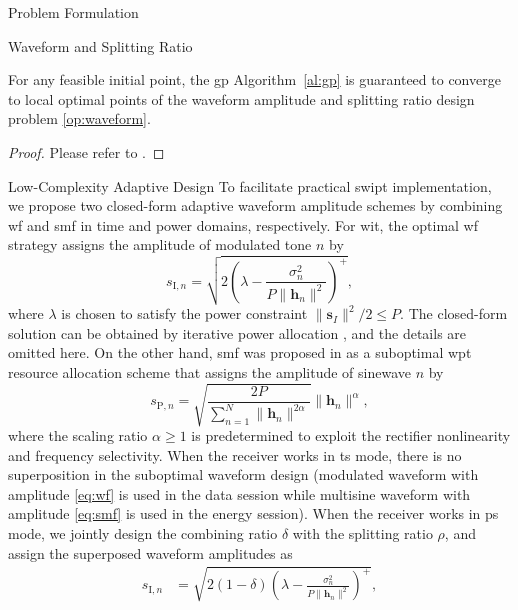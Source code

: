 \begin{section}{Problem Formulation}
\begin{subsection}{Waveform and Splitting Ratio}
		\begin{proposition}\label{pr:gp}
			For any feasible initial point, the \gls{gp} Algorithm~\ref{al:gp} is guaranteed to converge to local optimal points of the waveform amplitude and splitting ratio design problem \eqref{op:waveform}.
		\end{proposition}

		\begin{proof}\label{pf:gp}
			Please refer to \cite{Clerckx2016a,Clerckx2018b}.
		\end{proof}
	\end{subsection}


	\begin{subsection}{Low-Complexity Adaptive Design}
		To facilitate practical \gls{swipt} implementation, we propose two closed-form adaptive waveform amplitude schemes by combining \gls{wf} and \gls{smf} in time and power domains, respectively. For \gls{wit}, the optimal \gls{wf} strategy assigns the amplitude of modulated tone $n$ by
		\begin{equation}\label{eq:wf}
			s_{\mathrm{I}, n} = \sqrt{2\left(\lambda - \frac{\sigma_n^2}{P \lVert{\mathbf{h}_n}\rVert^2}\right)^+},
		\end{equation}
		where $\lambda$ is chosen to satisfy the power constraint $\lVert{\mathbf{s}_I}\rVert^2 / 2 \le P$. The closed-form solution can be obtained by iterative power allocation \cite{Tse2005}, and the details are omitted here. On the other hand, \gls{smf} was proposed in \cite{Clerckx2017} as a suboptimal \gls{wpt} resource allocation scheme that assigns the amplitude of sinewave $n$ by
		\begin{equation}\label{eq:smf}
			s_{\mathrm{P}, n} = \sqrt{\frac{2 P}{\sum_{n=1}^N \lVert{\mathbf{h}_n \rVert^{2 \alpha}}}}\lVert{\mathbf{h}_n}\rVert^\alpha,
		\end{equation}
		where the scaling ratio $\alpha \ge 1$ is predetermined to exploit the rectifier nonlinearity and frequency selectivity. When the receiver works in \gls{ts} mode, there is no superposition in the suboptimal waveform design (modulated waveform with amplitude \eqref{eq:wf} is used in the data session while multisine waveform with amplitude \eqref{eq:smf} is used in the energy session). When the receiver works in \gls{ps} mode, we jointly design the combining ratio $\delta$ with the splitting ratio $\rho$, and assign the superposed waveform amplitudes as
		\begin{align}
			s_{\mathrm{I}, n} &= \sqrt{2(1 - \delta)\left(\lambda - \frac{\sigma_n^2}{P \lVert{\mathbf{h}_n}\rVert^2}\right)^+}, \label{eq:s_i}\\

\end{align}
\end{subsection}
\end{section}
